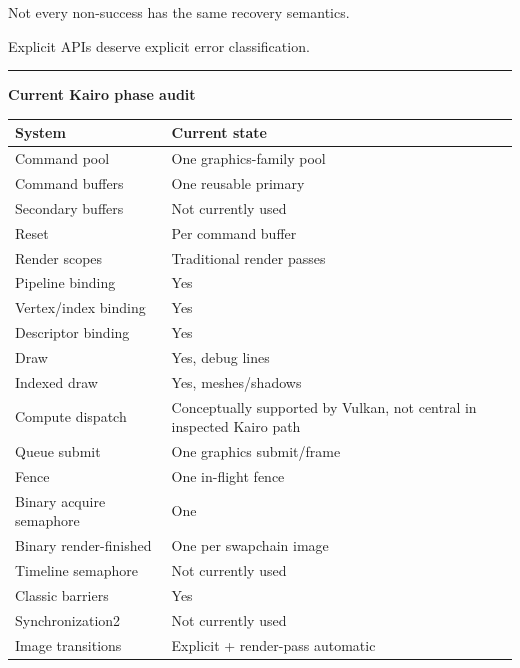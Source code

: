 Not every non-success has the same recovery semantics.

Explicit APIs deserve explicit error classification.

\begin{center}\rule{0.5\linewidth}{0.5pt}\end{center}

\textbf{Current Kairo phase audit}

{\def\LTcaptype{none} %
\begin{longtable}[]{@{}
  >{\raggedright\arraybackslash}p{}
  >{\raggedright\arraybackslash}p{}@{}}
\toprule\noalign{}
\begin{minipage}[b]{\linewidth}\raggedright
System
\end{minipage} & \begin{minipage}[b]{\linewidth}\raggedright
Current state
\end{minipage} \\
\midrule\noalign{}
\endhead
\bottomrule\noalign{}
\endlastfoot
Command pool & One graphics-family pool \\
Command buffers & One reusable primary \\
Secondary buffers & Not currently used \\
Reset & Per command buffer \\
Render scopes & Traditional render passes \\
Pipeline binding & Yes \\
Vertex/index binding & Yes \\
Descriptor binding & Yes \\
Draw & Yes, debug lines \\
Indexed draw & Yes, meshes/shadows \\
Compute dispatch & Conceptually supported by Vulkan, not central in inspected Kairo path \\
Queue submit & One graphics submit/frame \\
Fence & One in-flight fence \\
Binary acquire semaphore & One \\
Binary render-finished & One per swapchain image \\
Timeline semaphore & Not currently used \\
Classic barriers & Yes \\
Synchronization2 & Not currently used \\
Image transitions & Explicit + render-pass automatic \\

\end{longtable}}
